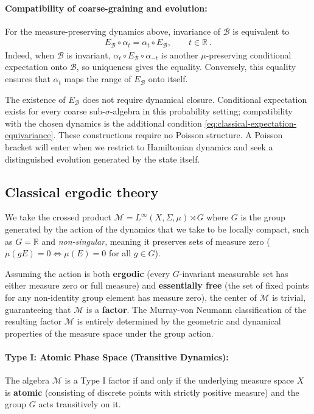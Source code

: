 \documentclass[a4paper,11pt]{article}
\theoremstyle{definition}
\newcommand{\mB}{\mathcal{B}}
\newcommand{\mM}{\mathcal{M}}
\begin{document}
\paragraph{Compatibility of coarse-graining and evolution:}
For the measure-preserving dynamics above, invariance of $\mB$ is equivalent to
\begin{align}\label{eq:classical-expectation-equivariance}
    E_{\mB}\circ\alpha_t=\alpha_t\circ E_{\mB},
    \qquad t\in\mathbb R\ .
\end{align}
Indeed, when $\mB$ is invariant, $\alpha_t\circ E_{\mB}\circ\alpha_{-t}$ is another $\mu$-preserving conditional expectation onto $\mB$, so uniqueness gives the equality. Conversely, this equality ensures that $\alpha_t$ maps the range of $E_{\mB}$ onto itself.

The existence of $E_{\mB}$ does not require dynamical closure. Conditional expectation exists for every coarse sub-$\sigma$-algebra in this probability setting; compatibility with the chosen dynamics is the additional condition \eqref{eq:classical-expectation-equivariance}. These constructions require no Poisson structure. A Poisson bracket will enter when we restrict to Hamiltonian dynamics and seek a distinguished evolution generated by the state itself.

\subsection{Classical ergodic theory} 

We take the crossed product $\mM=L^\infty(X,\Sigma,\mu)\rtimes G$ where $G$ is the group generated by the action of the dynamics that we take to be locally compact, such as $G=\mathbb{R}$ and \textit{non-singular}, meaning it preserves sets of measure zero ($\mu(gE) = 0 \iff \mu(E) = 0$ for all $g \in G$). 

Assuming the action is both \textbf{ergodic} (every $G$-invariant measurable set has either measure zero or full measure) and \textbf{essentially free} (the set of fixed points for any non-identity group element has measure zero), the center of $\mathcal{M}$ is trivial, guaranteeing that $\mathcal{M}$ is a \textbf{factor}. The Murray-von Neumann classification of the resulting factor $\mathcal{M}$ is entirely determined by the geometric and dynamical properties of the measure space under the group action.

\paragraph{Type I: Atomic Phase Space (Transitive Dynamics):}
The algebra $\mathcal{M}$ is a Type I factor if and only if the underlying measure space $X$ is \textbf{atomic} (consisting of discrete points with strictly positive measure) and the group $G$ acts transitively on it. 
\end{document}
